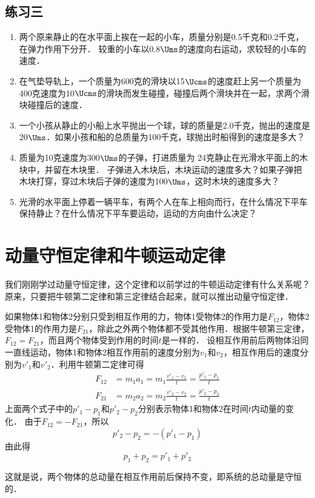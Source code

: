 \subsection*{练习三}
\begin{enumerate}
    \item 两个原来静止的在水平面上挨在一起的小车，质量分别是0.5千克和0.2千克，在弹力作用下分开．
    较重的小车以0.8$\Ums$的速度向右运动，求较轻的小车的速度．
    \item 在气垫导轨上，一个质量为600克的滑块以15$\Ucms$的速度赶上另一个质量为400克速度为10$\Ucms$的滑块而发生碰撞，碰撞后两个滑块并在一起，求两个滑块碰撞后的速度．
    \item 一个小孩从静止的小船上水平抛出一个球，球的质量是2.0千克，抛出的速度是20$\Ums$．如果小孩和船的总质量为100千克，球抛出时船得到的速度是多大？
    \item 质量为10克速度为300$\Ums$的子弹，打进质量为
    24克静止在光滑水平面上的木块中，并留在木块里．
    子弹进入木块后，木块运动的速度多大？如果子弹把木块打穿，穿过木块后子弹的速度为100$\Ums$，这时木块的速度多大？
    \item 光滑的水平面上停着一辆平车，有两个人在车上相向而行，在什么情况下平车保持静止？在什么情况下平车要运动，运动的方向由什么决定？
\end{enumerate}

\section{动量守恒定律和牛顿运动定律}
我们刚刚学过动量守恒定律，这个定律和以前学过的牛顿运动定律有什么关系呢？原来，只要把牛顿第二定律和第三定律结合起来，就可以推出动量守恒定律．

如果物体1和物体2分别只受到相互作用的力，物体1受物体2的作用力是$F_{12}$，物体2受物体1的作用力是$F_{21}$，除此之外两个物体都不受其他作用．根据牛顿第三定律，$F_{12}=F_{21}$，而且两个物体受到作用的时间$t$是一样的．
设相互作用前后两物体沿同一直线运动，物体1和物体2相互作用前的速度分别为$v_1$和$v_2$，相互作用后的速度分别为$v'_1$和$v'_2$．利用牛顿第二定律可得
\[\begin{split}
    F_{12}&=m_1a_1=m_1\frac{v'_1-v_1}{t}=\frac{p'_1-p_1}{t}\\
F_{21}&=m_2a_2=m_2\frac{v'_2-v_2}{t}=\frac{p'_2-p_2}{t}
\end{split}\]
上面两个式子中的$p'_1-p_1$和$p'_2-p_2$分别表示物体1和物体2在时间$t$内动量的变化．
由于$F_{12}=-F_{21}$，所以
\[p'_2-p_2=- (p'_1-p_1)\]
由此得
\[p_1+p_2=p'_1+p'_2\]

这就是说，两个物体的总动量在相互作用前后保持不变，即系统的总动量是守恒的．

